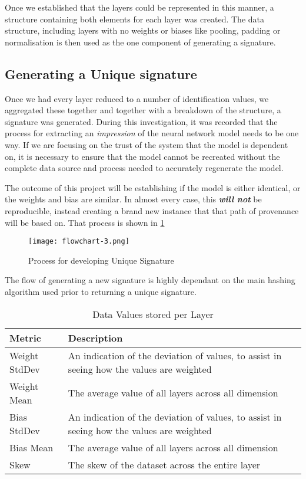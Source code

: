 Once we established that the layers could be represented in this manner, a structure containing both elements for each layer was created. The data structure, including layers with no weights or biases like pooling, padding or normalisation is then used as the one component of generating a signature.

\subsection{Generating a Unique signature}
Once we had every layer reduced to a number of identification values, we aggregated these together and together with a breakdown of the structure, a signature was generated. During this investigation, it was recorded that the process for extracting an \textit{impression} of the neural network model needs to be one way. If we are focusing on the trust of the system that the model is dependent on, it is necessary to ensure that the model cannot be recreated without the complete data source and process needed to accurately regenerate the model.

The outcome of this project will be establishing if the model is either identical, or the weights and bias are similar. In almost every case, this \textit{\textbf{will not}} be reproducible, instead creating a brand new instance that that path of provenance will be based on. That process is shown in \ref{fig_sig_generator}

\begin{figure}[!ht]
    \centering
    \texttt{[image: flowchart-3.png]}
    \caption{Process for developing Unique Signature}
    \label{fig_sig_generator}
\end{figure}

The flow of generating a new signature is highly dependant on the main hashing algorithm used prior to returning a unique signature. 

\begin{table}[!ht]
    \centering
    \caption{Data Values stored per Layer}
    \setlength\tabcolsep{0pt} %
    \begin{tabular}{@{} p{2cm} p{6.5cm}  @{}}
        \hline
        Metric & Description \\
        \hline
        Weight StdDev  & An indication of the deviation of values, to assist in seeing how the values are weighted \\
        Weight Mean    & The average value of all layers across all dimension \\
        Bias StdDev  & An indication of the deviation of values, to assist in seeing how the values are weighted \\
        Bias Mean    & The average value of all layers across all dimension \\
        Skew   & The skew of the dataset across the entire layer \\
        \hline
    \end{tabular}
\end{table}

